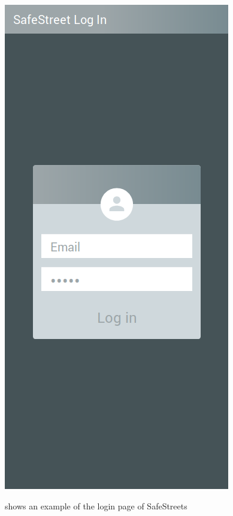 \documentclass[../RASD.tex]{subfiles}
\begin{document}
            \begin{figure}[H]
                \centering
                \includegraphics[scale = 0.4]{assets/login.png}\\[1.6 cm]
                \caption[\textit{User} Login \textit{Mockup}]{shows an example of the login page of SafeStreets}
            \end{figure}
\end{document}
